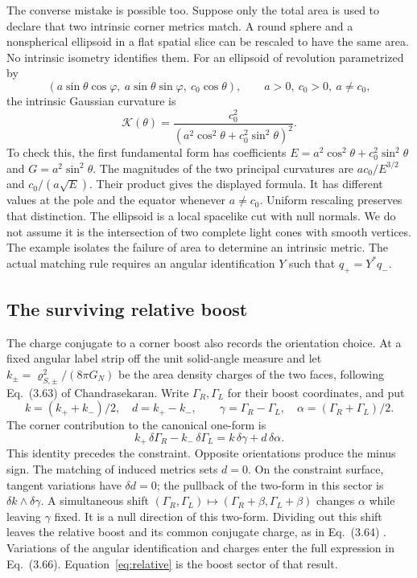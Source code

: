 \documentclass[11pt,letterpaper]{article}
\begin{document}
The converse mistake is possible too. Suppose only the total area is used
to declare that two intrinsic corner metrics match. A round sphere and a
nonspherical ellipsoid in a flat spatial slice can be rescaled to have the
same area. No intrinsic isometry identifies them. For an ellipsoid of
revolution parametrized by
\[
 (a\sin\theta\cos\varphi,\ a\sin\theta\sin\varphi,\ c_0\cos\theta),
 \qquad a>0,\ c_0>0,\ a\ne c_0,
\]
the intrinsic Gaussian curvature is
\[
 \mathcal K(\theta)=
 \frac{c_0^2}{(a^2\cos^2\theta+c_0^2\sin^2\theta)^2}.
\]
To check this, the first fundamental form has coefficients
\(E=a^2\cos^2\theta+c_0^2\sin^2\theta\) and \(G=a^2\sin^2\theta\).
The magnitudes of the two principal curvatures are
\(ac_0/E^{3/2}\) and \(c_0/(a\sqrt E)\). Their product gives the displayed
formula. It has different values at the pole and the equator whenever
\(a\ne c_0\). Uniform rescaling preserves that distinction. The ellipsoid
is a local spacelike cut with null normals. We do not assume it is
the intersection of two complete light cones with smooth vertices.
The example isolates the failure of area to determine an intrinsic metric.
The actual matching rule requires an angular identification \(Y\) such
that \(q_+=Y^*q_-\).

\subsection{The surviving relative boost}
The charge conjugate to a corner boost also records the orientation
choice. At a fixed angular label strip off the unit solid-angle measure
and let \(k_\pm=\varrho_{S,\pm}^2/(8\pi G_N)\) be the area density
charges of the two faces, following Eq.~(3.63) of Chandrasekaran.
Write \(\Gamma_R,\Gamma_L\) for their boost coordinates, and put
\[
 k=(k_++k_-)/2,\quad d=k_+-k_-,\qquad
 \gamma=\Gamma_R-\Gamma_L,\quad
 \alpha=(\Gamma_R+\Gamma_L)/2.
\]
The corner contribution to the canonical one-form is
\begin{equation}
 k_+\,\delta\Gamma_R-k_-\,\delta\Gamma_L
       =k\,\delta\gamma+d\,\delta\alpha .
 \label{eq:relative}
\end{equation}
This identity precedes the constraint. Opposite orientations produce the
minus sign. The matching of induced metrics sets \(d=0\).
On the constraint surface, tangent variations have \(\delta d=0\);
the pullback of the two-form in this sector is
\(\delta k\wedge\delta\gamma\). A simultaneous shift
\((\Gamma_R,\Gamma_L)\mapsto(\Gamma_R+\beta,\Gamma_L+\beta)\) changes
\(\alpha\) while leaving \(\gamma\) fixed. It is a null direction of this
two-form. Dividing out this shift leaves the relative boost and its common
conjugate charge, as in Eq.~(3.64) \cite{nc}. Variations of the angular
identification and charges enter the full expression in Eq.~(3.66).
Equation~\eqref{eq:relative} is the boost sector of that result.
\end{document}
